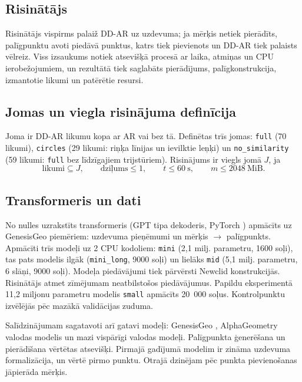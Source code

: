 \documentclass[nolabels]{../template/zpd}
\begin{document}
\subsection{Risinātājs}
Risinātājs vispirms palaiž DD-AR uz uzdevuma; ja mērķis netiek pierādīts, palīgpunktu avoti piedāvā
punktus, katrs tiek pievienots un DD-AR tiek palaists vēlreiz. Viss izsaukums notiek atsevišķā
procesā ar laika, atmiņas un CPU ierobežojumiem, un rezultātā tiek saglabāts pierādījums,
palīgkonstrukcija, izmantotie likumi un patērētie resursi.

\subsection{Jomas un viegla risinājuma definīcija}
Joma ir DD-AR likumu kopa ar AR vai bez tā. Definētas trīs jomas: \texttt{full} (70 likumi),
\texttt{circles} (29 likumi: riņķa līnijas un ievilktie leņķi) un \texttt{no\_similarity}
(59 likumi: \texttt{full} bez līdzīgajiem trijstūriem). Risinājums ir viegls jomā $J$, ja
\begin{equation}
  \text{likumi} \subseteq J, \qquad \text{dziļums} \le 1, \qquad t \le 60~\text{s}, \qquad m \le 2048~\text{MiB}.
  \label{eq:viegls}
\end{equation}

\subsection{Transformeris un dati}
No nulles uzrakstīts transformeris  (GPT tipa dekoderis, PyTorch
) apmācīts uz \trainExamples{} GenesisGeo piemēriem: uzdevuma
pieņēmumi un mērķis $\to$ palīgpunkts. Apmācīti trīs modeļi uz 2 CPU kodoliem: \texttt{mini}
(2,1 milj. parametru, 1600 soļi), tas pats modelis ilgāk (\texttt{mini\_long}, 9000 soļi) un
lielāks \texttt{mid} (5,1 milj. parametru, 6 slāņi, 9000 soļi). Modeļa piedāvājumi tiek pārvērsti
Newclid konstrukcijās. Risinātājs atmet zīmējumam neatbilstošos piedāvājumus.
Papildu eksperimentā 11,2 miljonu parametru modelis \texttt{small} apmācīts 20~000 soļus.
Kontrolpunktu izvēlējās pēc mazākā validācijas zuduma.

Salīdzinājumam sagatavoti arī gatavi modeļi: GenesisGeo , AlphaGeometry
valodas modelis  un mazi vispārīgi valodas modeļi.
Palīgpunkta ģenerēšana un pierādīšana vērtētas atsevišķi. Pirmajā gadījumā modelim ir zināma uzdevuma formalizācija, un vērtē pirmo punktu. Otrajā dzinējam pēc punkta pievienošanas jāpierāda mērķis.
\end{document}
